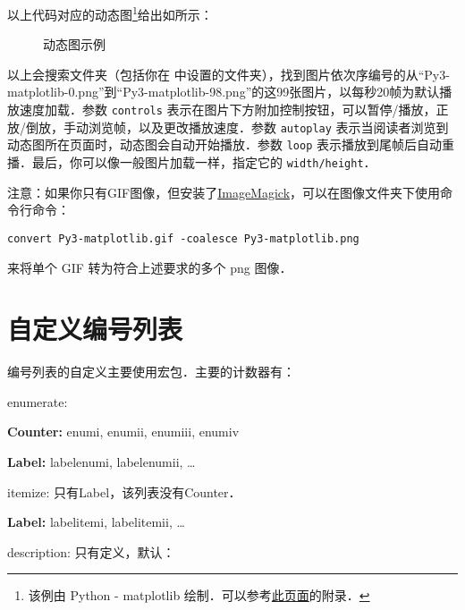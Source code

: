 以上代码对应的动态图\footnote{该例由 Python - matplotlib 绘制．可以参考\href{https://wklchris.github.io/Py3-matplotlib.html}{此页面}的附录．}给出如所示：
\begin{figure}[!hbt]
  \centering
  \caption{动态图示例}\label{fig:GIF}
\end{figure}

以上会搜索文件夹（包括你在  中设置的文件夹），找到图片依次序编号的从“Py3-matplotlib-0.png”到“Py3-matplotlib-98.png”的这99张图片，以每秒20帧为默认播放速度加载．参数 \texttt{controls} 表示在图片下方附加控制按钮，可以暂停/播放，正放/倒放，手动浏览帧，以及更改播放速度．参数 \texttt{autoplay} 表示当阅读者浏览到动态图所在页面时，动态图会自动开始播放．参数 \texttt{loop} 表示播放到尾帧后自动重播．最后，你可以像一般图片加载一样，指定它的 \texttt{width/height}．

注意：如果你只有GIF图像，但安装了\href{https://www.imagemagick.org/script/download.php}{ImageMagick}，可以在图像文件夹下使用命令行命令：

\begin{verbatim}
convert Py3-matplotlib.gif -coalesce Py3-matplotlib.png
\end{verbatim}

来将单个 GIF 转为符合上述要求的多个 png 图像．

\section{自定义编号列表}
\label{sec:list}
编号列表的自定义主要使用宏包．主要的计数器有：
\begin{feai}
\item enumerate:
  \begin{feai}
    \item \textbf{Counter:} enumi, enumii, enumiii, enumiv
    \item \textbf{Label:} labelenumi, labelenumii, \ldots
  \end{feai}
\item itemize: 只有Label，该列表没有Counter． 
  \begin{feai}
    \item \textbf{Label:} labelitemi, labelitemii, \ldots
  \end{feai}
\item description: 只有定义，默认：
\begin{latex}
\newcommand*{\descriptionlabel}[1]{\hspace\labelsep
    \normalfont\bfseries #1} %
\end{latex}
\end{feai}

